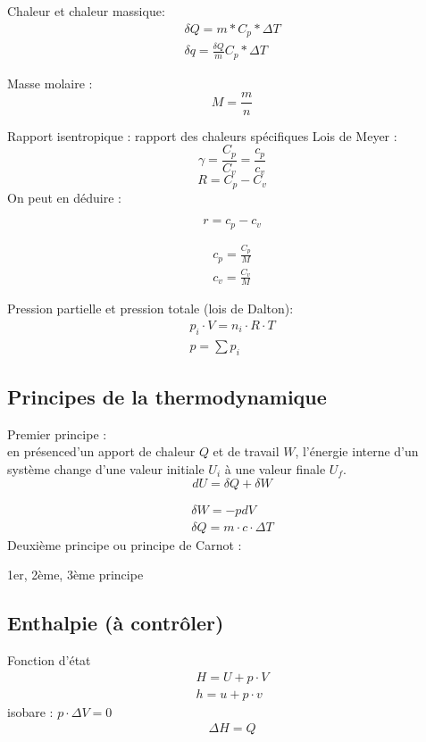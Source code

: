 	Chaleur et chaleur massique: 
	\begin{eqnarray}
	\delta Q=m*C_p*\Delta T\\
	\delta q= \frac{\delta Q}{m} C_p* \Delta T
	\end{eqnarray}
	
	Masse molaire :
	\begin{equation}
	M=\frac{m}{n}
	\end{equation}
	
	Rapport isentropique : rapport des chaleurs spécifiques
	Lois de Meyer :
	\begin{equation}
	\gamma=\frac{C_p}{C_v}=\frac{c_p}{c_v}
	\end{equation}
	\begin{equation}
	R=C_p-C_v
	\end{equation}
	On peut en déduire :
	
	\begin{equation}
	r=c_p-c_v
	\end{equation}
	
	\begin{eqnarray}
	c_p=\frac{C_p}{M}\\
	c_v=\frac{C_v}{M}
	\end{eqnarray}
	
	Pression partielle et pression totale (lois de Dalton):
	\begin{eqnarray}
	p_i \cdot V=n_i \cdot R \cdot T\\
	p=\sum p_i
	\end{eqnarray}
	
	\subsection{Principes de la thermodynamique}
	Premier principe :\\
	en présenced'un apport de chaleur $Q$ et de travail $W$, l'énergie interne d'un système change d'une valeur initiale $U_i$ à une valeur finale $U_f$. 
	\begin{equation}
	dU=\delta Q + \delta W
	\end{equation}
	
	\begin{eqnarray}
	\delta W = - p dV\\
	\delta Q = m \cdot c \cdot \Delta T 
	\end{eqnarray}
	Deuxième principe ou principe de Carnot :
	
	
	1er, 2ème, 3ème principe
	\subsection{Enthalpie (à contrôler)}
	Fonction d'état
	\begin{eqnarray}
	H = U + p \cdot V \\
	h = u + p \cdot v
	\end{eqnarray}
	isobare : $p \cdot \Delta V = 0$
	\begin{eqnarray}
	\Delta H = Q
	\end{eqnarray}
